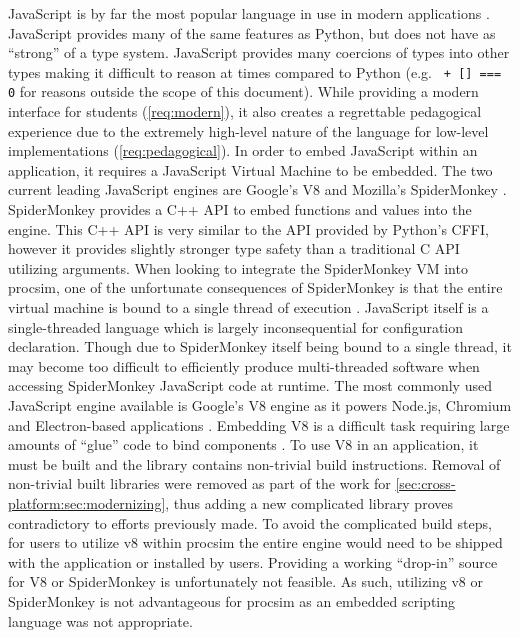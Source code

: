 JavaScript is by far the most popular language in use in modern applications \cite{StackOverflowSurvey2016}. JavaScript provides many of the same features as Python, but does not have as ``strong'' of a type system. JavaScript provides many coercions of types into other types making it difficult to reason at times compared to Python (e.g. \texttt{{} + [] === 0} for reasons outside the scope of this document). While providing a modern interface for students (\cref{req:modern}), it also creates a regrettable pedagogical experience due to the extremely high-level nature of the language for low-level implementations (\cref{req:pedagogical}). In order to embed JavaScript within an application, it requires a JavaScript Virtual Machine to be embedded. The two current leading JavaScript engines are Google's V8 \cite{Google:V8} and Mozilla's SpiderMonkey \cite{MDN:SpiderMonkey}. SpiderMonkey provides a C++ API to embed functions and values into the engine. This C++ API is very similar to the API provided by Python's CFFI, however it provides slightly stronger type safety than a traditional C API utilizing  arguments. When looking to integrate the SpiderMonkey VM into procsim, one of the unfortunate consequences of SpiderMonkey is that the entire virtual machine is bound to a single thread of execution \cite{MDN:SpiderMonkey:UserGuide}. JavaScript itself is a single-threaded language which is largely inconsequential for configuration declaration. Though due to SpiderMonkey itself being bound to a single thread, it may become too difficult to efficiently produce multi-threaded software when accessing SpiderMonkey JavaScript code at runtime. The most commonly used JavaScript engine available is Google's V8 engine as it powers Node.js, Chromium and Electron-based applications \cite{Google:V8}. Embedding V8 is a difficult task requiring large amounts of ``glue'' code to bind components \cite{Google:V8:Embedding}. To use V8 in an application, it must be built and the library contains non-trivial build instructions. Removal of non-trivial built libraries were removed as part of the work for \cref{sec:cross-platform:sec:modernizing}, thus adding a new complicated library proves contradictory to efforts previously made. To avoid the complicated build steps, for users to utilize v8 within procsim the entire engine would need to be shipped with the application or installed by users. Providing a working ``drop-in'' source for V8 or SpiderMonkey is unfortunately not feasible. As such, utilizing v8 or SpiderMonkey is not advantageous for procsim as an embedded scripting language was not appropriate.

